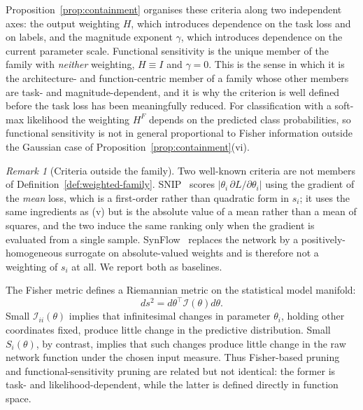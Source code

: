 \documentclass{article}
\theoremstyle{definition}
\theoremstyle{remark}
\newtheorem{remark}[theorem]{Remark}
\begin{document}
Proposition~\ref{prop:containment} organises these criteria along two
independent axes: the output weighting $H$, which introduces dependence on the
task loss and on labels, and the magnitude exponent $\gamma$, which introduces
dependence on the current parameter scale. Functional sensitivity is the unique
member of the family with \emph{neither} weighting, $H\equiv I$ and $\gamma=0$.
This is the sense in which it is the architecture- and function-centric member
of a family whose other members are task- and magnitude-dependent, and it is
why the criterion is well defined before the task loss has been meaningfully
reduced. For classification with a soft-max likelihood the weighting $H^F$
depends on the predicted class probabilities, so functional sensitivity is not
in general proportional to Fisher information outside the Gaussian case of
Proposition~\ref{prop:containment}(vi).

\begin{remark}[Criteria outside the family]
\label{rem:outside-family}
Two well-known criteria are not members of
Definition~\ref{def:weighted-family}. SNIP~\cite{lee2019snip} scores
$|\theta_i\,\partial L/\partial\theta_i|$ using the gradient of the \emph{mean}
loss, which is a first-order rather than quadratic form in $s_i$; it uses the
same ingredients as (v) but is the absolute value of a mean rather than a mean
of squares, and the two induce the same ranking only when the gradient is
evaluated from a single sample. SynFlow~\cite{tanaka2020synflow} replaces the
network by a positively-homogeneous surrogate on absolute-valued weights and is
therefore not a weighting of $s_i$ at all. We report both as baselines.
\end{remark}

The Fisher metric defines a Riemannian metric on the statistical model manifold:
\begin{equation}
    ds^2
    =
    d\theta^\top
    \mathcal I(\theta)
    d\theta.
\end{equation}
Small \(\mathcal I_{ii}(\theta)\) implies that infinitesimal changes in parameter \(\theta_i\), holding other coordinates fixed, produce little change in the predictive distribution. Small \(S_i(\theta)\), by contrast, implies that such changes produce little change in the raw network function under the chosen input measure. Thus Fisher-based pruning and functional-sensitivity pruning are related but not identical: the former is task- and likelihood-dependent, while the latter is defined directly in function space.
\end{document}
